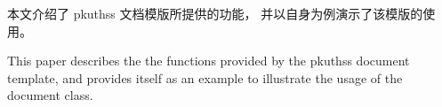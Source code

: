 %

\begin{cabstract}

	本文介绍了 pkuthss 文档模版所提供的功能，
	并以自身为例演示了该模版的使用。

\end{cabstract}

\begin{eabstract}

	This paper describes the the functions provided by
	the pkuthss document template,
	and provides itself as an example to illustrate
	the usage of the document class.

\end{eabstract}

